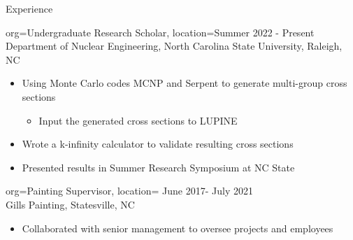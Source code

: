 \begin{ResumeSection}{Experience}
    \begin{ResumeSubsection}
    {
        org=Undergraduate Research Scholar,
        location={Summer 2022 - Present}
    } 
    \\
    Department of Nuclear Engineering, North Carolina State University, Raleigh, NC
        \begin{itemize}
            \item Using Monte Carlo codes MCNP and Serpent to generate multi-group cross sections
                \begin{itemize}
                    \item Input the generated cross sections to LUPINE
                \end{itemize}
            \item Wrote a k-infinity calculator to validate resulting cross sections
            \item Presented results in Summer Research Symposium at NC State 
        \end{itemize}
    \end{ResumeSubsection}
    \begin{ResumeSubsection}
    {
        org=Painting Supervisor,
        location={ June 2017- July 2021}
    } 
    \\
    Gills Painting, Statesville, NC
        \begin{itemize}
            \item Collaborated with senior management to oversee projects and employees
        \end{itemize}
    \end{ResumeSubsection}
\end{ResumeSection}